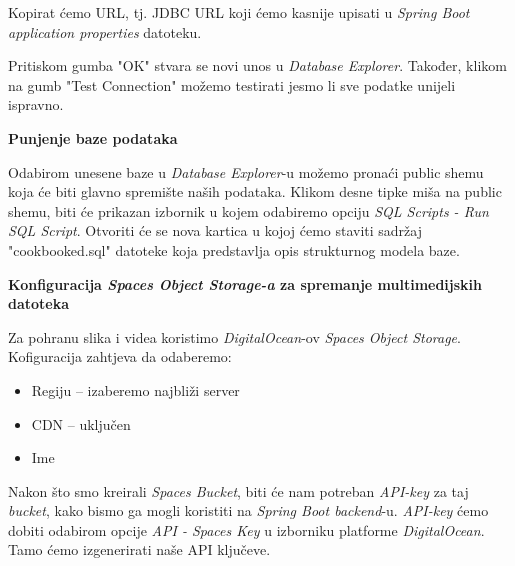 			\noindent Kopirat ćemo URL, tj. JDBC URL koji ćemo kasnije upisati u \textit{Spring Boot application
			properties} datoteku.

			\noindent Pritiskom gumba "OK" stvara se novi unos u \textit{Database Explorer}. Također, klikom na gumb
			"Test Connection" možemo testirati jesmo li sve podatke unijeli ispravno.

			\eject
			\noindent \textbf{Punjenje baze podataka}

			\noindent Odabirom unesene baze u \textit{Database Explorer}-u možemo pronaći public shemu koja će
			biti glavno spremište naših podataka. Klikom desne tipke miša na public shemu, biti će prikazan
			izbornik u kojem odabiremo opciju \textit{SQL Scripts - Run SQL Script}. Otvoriti će se nova kartica
			u kojoj ćemo staviti sadržaj "cookbooked.sql" datoteke koja predstavlja opis strukturnog modela baze.
			
			\medbreak
			\noindent \textbf{Konfiguracija \textit{Spaces Object Storage-a} za spremanje multimedijskih datoteka}
			
			\noindent Za pohranu slika i videa koristimo \textit{DigitalOcean}-ov \textit{Spaces Object Storage}.
			Kofiguracija zahtjeva da odaberemo:
			
			\begin{itemize}
				\item Regiju – izaberemo najbliži server
				\item CDN – uključen
				\item Ime
			\end{itemize}

			\noindent Nakon što smo kreirali \textit{Spaces Bucket}, biti će nam potreban \textit{API-key} za taj
			\textit{bucket}, kako bismo ga mogli koristiti na \textit{Spring Boot backend}-u.
			\textit{API-key} ćemo dobiti odabirom opcije \textit{API - Spaces Key} u izborniku platforme
			\textit{DigitalOcean}. Tamo ćemo izgenerirati naše API ključeve.


